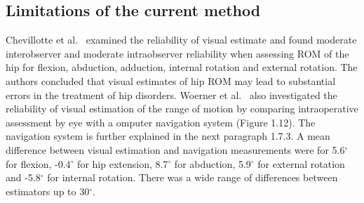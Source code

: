 \documentclass[whitelogo]{tudelft-report}
\begin{document}
{\subsection{Limitations of the current method}
Chevillotte et al.~\cite{chevillotte2009variability} examined the reliability of visual estimate and found moderate interobserver and moderate intraobserver reliability when assessing ROM of the hip for flexion, abduction, adduction, internal rotation and external rotation. The authors concluded that visual estimates of hip ROM may lead to substantial errors in the treatment of hip disorders. Woerner et al.~\cite{woerner2016visual} also investigated the reliability of visual estimation of the range of motion by comparing intraoperative assessment by eye with a omputer navigation system (Figure 1.12). The navigation system is further explained in the next paragraph 1.7.3. A mean difference between visual estimation and navigation measurements were for 5.6$^\circ$ for flexion, -0.4$^\circ$ for hip extension, 8.7$^\circ$ for abduction, 5.9$^\circ$ for external rotation and -5.8$^\circ$ for internal rotation. There was a wide range of differences between estimators up to 30$^\circ$. 
\newline
\newline
}
\end{document}
